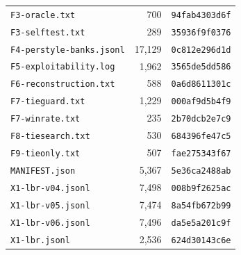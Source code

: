 \begin{longtable}{lrl}
\texttt{F3-oracle.txt} & 700 & \texttt{94fab4303d6f} \\
\texttt{F3-selftest.txt} & 289 & \texttt{35936f9f0376} \\
\texttt{F4-perstyle-banks.jsonl} & 17,129 & \texttt{0c812e296d1d} \\
\texttt{F5-exploitability.log} & 1,962 & \texttt{3565de5dd586} \\
\texttt{F6-reconstruction.txt} & 588 & \texttt{0a6d8611301c} \\
\texttt{F7-tieguard.txt} & 1,229 & \texttt{000af9d5b4f9} \\
\texttt{F7-winrate.txt} & 235 & \texttt{2b70dcb2e7c9} \\
\texttt{F8-tiesearch.txt} & 530 & \texttt{684396fe47c5} \\
\texttt{F9-tieonly.txt} & 507 & \texttt{fae275343f67} \\
\texttt{MANIFEST.json} & 5,367 & \texttt{5e36ca2488ab} \\
\texttt{X1-lbr-v04.jsonl} & 7,498 & \texttt{008b9f2625ac} \\
\texttt{X1-lbr-v05.jsonl} & 7,474 & \texttt{8a54fb672b99} \\
\texttt{X1-lbr-v06.jsonl} & 7,496 & \texttt{da5e5a201c9f} \\
\texttt{X1-lbr.jsonl} & 2,536 & \texttt{624d30143c6e} \\
\bottomrule
\end{longtable}
